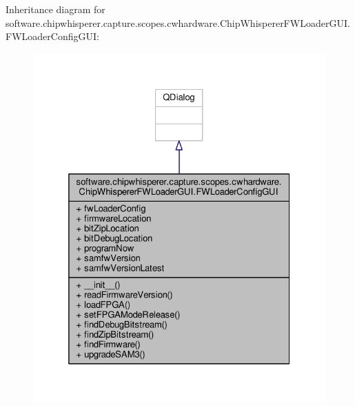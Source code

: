 Inheritance diagram for software.\+chipwhisperer.\+capture.\+scopes.\+cwhardware.\+Chip\+Whisperer\+F\+W\+Loader\+G\+U\+I.\+F\+W\+Loader\+Config\+G\+U\+I\+:\nopagebreak
\begin{figure}[H]
\begin{center}
\leavevmode
\includegraphics[width=325pt]{d5/d62/classsoftware_1_1chipwhisperer_1_1capture_1_1scopes_1_1cwhardware_1_1ChipWhispererFWLoaderGUI_1_166403b7a8f2b8fe6e8b29e318bf0a57}
\end{center}
\end{figure}


